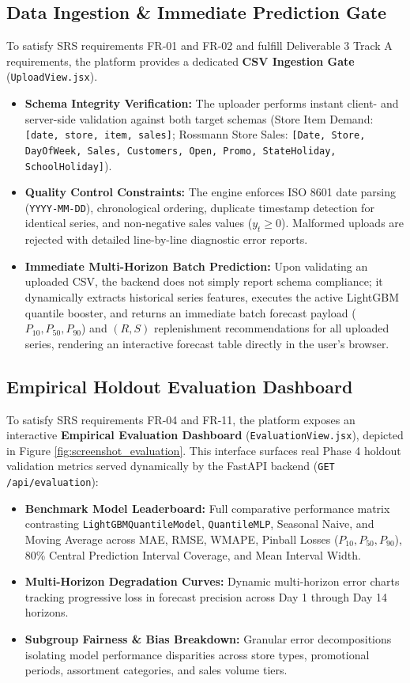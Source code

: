\documentclass[11pt,a4paper]{article}
\begin{document}
\subsection{Data Ingestion \& Immediate Prediction Gate}
To satisfy SRS requirements FR-01 and FR-02 and fulfill Deliverable 3 Track A requirements, the platform provides a dedicated \textbf{CSV Ingestion Gate} (\texttt{UploadView.jsx}).
\begin{itemize}
    \item \textbf{Schema Integrity Verification:} The uploader performs instant client- and server-side validation against both target schemas (Store Item Demand: \texttt{[date, store, item, sales]}; Rossmann Store Sales: \texttt{[Date, Store, DayOfWeek, Sales, Customers, Open, Promo, StateHoliday, SchoolHoliday]}).
    \item \textbf{Quality Control Constraints:} The engine enforces ISO 8601 date parsing (\texttt{YYYY-MM-DD}), chronological ordering, duplicate timestamp detection for identical series, and non-negative sales values ($y_t \ge 0$). Malformed uploads are rejected with detailed line-by-line diagnostic error reports.
    \item \textbf{Immediate Multi-Horizon Batch Prediction:} Upon validating an uploaded CSV, the backend does not simply report schema compliance; it dynamically extracts historical series features, executes the active LightGBM quantile booster, and returns an immediate batch forecast payload ($P_{10}, P_{50}, P_{90}$) and $(R, S)$ replenishment recommendations for all uploaded series, rendering an interactive forecast table directly in the user's browser.
\end{itemize}

\subsection{Empirical Holdout Evaluation Dashboard}
To satisfy SRS requirements FR-04 and FR-11, the platform exposes an interactive \textbf{Empirical Evaluation Dashboard} (\texttt{EvaluationView.jsx}), depicted in Figure \ref{fig:screenshot_evaluation}. This interface surfaces real Phase 4 holdout validation metrics served dynamically by the FastAPI backend (\texttt{GET /api/evaluation}):
\begin{itemize}
    \item \textbf{Benchmark Model Leaderboard:} Full comparative performance matrix contrasting \texttt{LightGBMQuantileModel}, \texttt{QuantileMLP}, Seasonal Naive, and Moving Average across MAE, RMSE, WMAPE, Pinball Losses ($P_{10}, P_{50}, P_{90}$), 80\% Central Prediction Interval Coverage, and Mean Interval Width.
    \item \textbf{Multi-Horizon Degradation Curves:} Dynamic multi-horizon error charts tracking progressive loss in forecast precision across Day 1 through Day 14 horizons.
    \item \textbf{Subgroup Fairness \& Bias Breakdown:} Granular error decompositions isolating model performance disparities across store types, promotional periods, assortment categories, and sales volume tiers.
\end{itemize}
\end{document}
